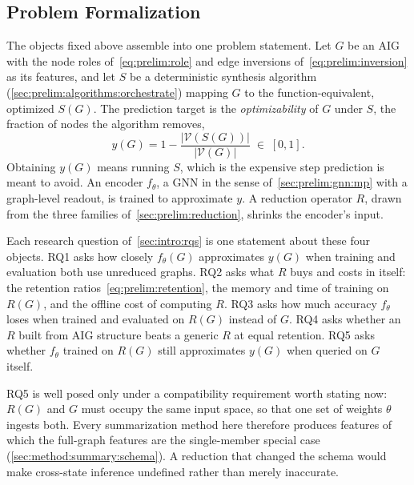 \subsection{Problem Formalization}


\label{sec:prelim:formalization}
The objects fixed above assemble into one problem statement. Let $G$ be an AIG with the
node roles of~\eqref{eq:prelim:role} and edge inversions of~\eqref{eq:prelim:inversion} as
its features, and let $S$ be a deterministic synthesis algorithm
(\ref{sec:prelim:algorithms:orchestrate}) mapping $G$ to the function-equivalent,
optimized $S(G)$. The prediction target is the \emph{optimizability} of $G$ under $S$,
the fraction of nodes the algorithm removes,
\begin{equation}
    y(G) = 1 - \frac{\left| \mathcal{V}(S(G)) \right|}{\left| \mathcal{V}(G) \right|}
    \;\in\; [0, 1].
    \label{eq:prelim:target}
\end{equation}
Obtaining $y(G)$ means running $S$, which is the expensive step prediction is meant to
avoid. An encoder $f_\theta$, a GNN in the sense of~\ref{sec:prelim:gnn:mp} with a
graph-level readout, is trained to approximate $y$. A reduction operator $R$, drawn from
the three families of~\ref{sec:prelim:reduction}, shrinks the encoder's input.

Each research question of~\ref{sec:intro:rqs} is one statement about these four objects.
RQ1 asks how closely $f_\theta(G)$ approximates $y(G)$ when training and evaluation both
use unreduced graphs. RQ2 asks what $R$ buys and costs in itself: the retention
ratios~\eqref{eq:prelim:retention}, the memory and time of training on $R(G)$, and the
offline cost of computing $R$. RQ3 asks how much accuracy $f_\theta$ loses when trained
and evaluated on $R(G)$ instead of $G$. RQ4 asks whether an $R$ built from AIG structure
beats a generic $R$ at equal retention. RQ5 asks whether $f_\theta$ trained on $R(G)$
still approximates $y(G)$ when queried on $G$ itself.

RQ5 is well posed only under a compatibility requirement worth stating now: $R(G)$ and
$G$ must occupy the same input space, so that one set of weights $\theta$ ingests both.
Every summarization method here therefore produces features of which the full-graph
features are the single-member special case (\ref{sec:method:summary:schema}). A
reduction that changed the schema would make cross-state inference undefined rather than
merely inaccurate.


